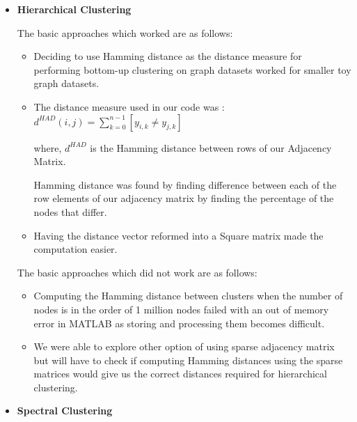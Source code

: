 \documentclass[11pt]{exam}
\begin{document}
\begin{itemize}
%

\item\textbf{Hierarchical Clustering}

The basic approaches which worked are as follows:
\begin{itemize}
	\item Deciding to use Hamming distance as the distance measure for performing bottom-up clustering on graph datasets worked for smaller toy graph datasets.

	\item The distance measure used in our code was : \\
	$d^{HAD}(i,j)=\sum_{k=0}^{n-1}[y_{i,k} \neq y_{j,k}]$ 

where, $d^{HAD}$ is the Hamming distance between rows of our Adjacency Matrix.

Hamming distance was found by finding difference between each of the row elements of our adjacency matrix by finding the percentage of the nodes that differ. 

\item Having the distance vector reformed into a Square matrix made the computation easier. 
\end{itemize}
 
The basic approaches which did not work are as follows:
\begin{itemize}
	\item Computing the Hamming distance between clusters when the number of nodes is in the order of 1 million nodes failed with an out of memory error in MATLAB as storing and processing them becomes difficult.
	\item We were able to explore other option of using sparse adjacency matrix but will have to check if computing Hamming distances using the sparse matrices would give us the correct distances required for hierarchical clustering.

\end{itemize}

\item\textbf{Spectral Clustering}\\


\end{itemize}
\end{document}
